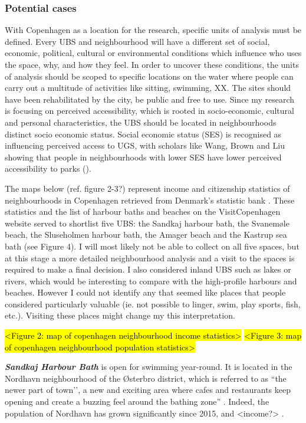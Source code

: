 \documentclass{article}
\newcommand{\bisection}[1]{\textbf{\textit{#1}}}
\begin{document}
\subsubsection{Potential cases}

With Copenhagen as a location for the research, specific units of analysis must be defined. Every UBS and neighbourhood will have a different set of social, economic, political, cultural or environmental conditions which influence who uses the space, why, and how they feel. In order to uncover these conditions, the units of analysis should be scoped to specific locations on the water where people can carry out a multitude of activities like sitting, swimming, XX. The sites should have been rehabilitated by the city, be public and free to use. 
Since my research is focusing on perceived accessibility, which is rooted in socio-economic, cultural and personal characteristics, the UBS should be located in neighbourhoods distinct socio economic status. Social economic status (SES) is recognised as influencing perceived access to UGS, with scholars like Wang, Brown and Liu showing that people in neighbourhoods with lower SES have lower perceived accessibility to parks (\citeyear{wang2015physical}).

The maps below (ref. figure 2-3?) represent income and citizenship statistics of neighbourhoods in Copenhagen retrieved from Denmark's statistic bank \parencite{copenhagenStatbank}. These statistics and the list of harbour baths and beaches on the VisitCopenhagen website \parencite{visitcopenhagen} served to shortlist five UBS: the Sandkaj harbour bath, the Svanemøle beach, the Sluseholmen harbour bath, the Amager beach and the Kastrup sea bath (see Figure 4). I will most likely not be able to collect on all five spaces, but at this stage a more detailed neighbourhood analysis and a visit to the spaces is required to make a final decision. 
I also considered inland UBS such as lakes or rivers, which would be interesting to compare with the high-profile harbours and beaches. However I could not identify any that seemed like places that people considered particularly valuable (ie. not possible to linger, swim, play sports, fish, etc.). Visiting these places might change my this interpretation.

\hl{<Figure 2: map of copenhagen neighbourhood income statistics>}
\hl{<Figure 3: map of copenhagen neighbourhood population statistics>}

\bisection{Sandkaj Harbour Bath} is open for swimming year-round. It is located in the Nordhavn neighbourhood of the Østerbro district, which is referred to as ``the newer part of town’’, a new and exciting area where cafes and restaurants keep opening and create a buzzing feel around the bathing zone” \parencite{visitcopenhagenSandkaj}. Indeed, the population of Nordhavn has grown significantly since 2015, and <income?> \parencite{copenhagenStatbank}.
\end{document}
